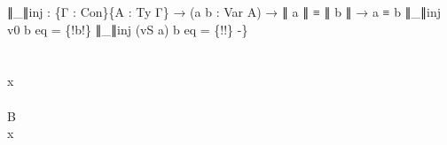 \documentclass{acm_proc_article-sp}
\begin{document}
{\begin{code}
{∥\_∥inj : \{Γ : Con\}\{A : Ty Γ\} → (a b : Var A) → ∥ a ∥ ≡ ∥ b ∥ → a ≡ b
∥\_∥inj v0 b eq = \{!b!\}
∥\_∥inj (vS a) b eq = \{!!\}
-\}}\<%
\\
%
\\
\> \AgdaSymbol{:} \AgdaSymbol{\{} \AgdaSymbol{:} \AgdaSymbol{\}\{}  \AgdaSymbol{:}  \AgdaSymbol{\}\{} \AgdaSymbol{:}  \AgdaSymbol{\}(} \AgdaSymbol{:}   \AgdaSymbol{)}   \AgdaSymbol{(}   \AgdaSymbol{)}   \<%
\\
\> \AgdaSymbol{\{}x \AgdaSymbol{=} \AgdaSymbol{\}}  \AgdaSymbol{=}  \AgdaSymbol{(} \AgdaSymbol{)}\<%
\\
%
\\
\> \AgdaSymbol{:} \AgdaSymbol{\{} \AgdaSymbol{:} \AgdaSymbol{\}\{}   \AgdaSymbol{:}  \AgdaSymbol{\}\{} \AgdaSymbol{:}  \AgdaSymbol{\}(} \AgdaSymbol{:}   \AgdaSymbol{)}   \AgdaSymbol{(} \AgdaSymbol{\{}B \AgdaSymbol{=} \AgdaSymbol{\}} \AgdaSymbol{(}   \AgdaSymbol{))}   \AgdaSymbol{(} \AgdaSymbol{)}\<%
\\
\> \AgdaSymbol{\{}x \AgdaSymbol{=} \AgdaSymbol{\}}  \AgdaSymbol{=}  \AgdaSymbol{(} \AgdaSymbol{(} \AgdaSymbol{))}\<%
\\
%
\\
\> \AgdaSymbol{:} \AgdaSymbol{\{}  \AgdaSymbol{:} \AgdaSymbol{\}\{} \AgdaSymbol{:}  \AgdaSymbol{\}\{}  \AgdaSymbol{:}   \AgdaSymbol{\}\{} \AgdaSymbol{:}  \AgdaSymbol{\}}               \<[97]%
\>[97]\<%
\\
\>  \AgdaSymbol{=}  \AgdaSymbol{\_}\<%
\\
\>\<%
\end{code}
}
\end{document}
